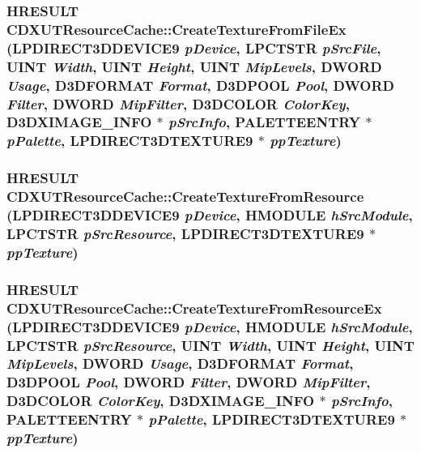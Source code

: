 \hypertarget{class_c_d_x_u_t_resource_cache_a4f33257885010dd13d4e996e9d3d2d3e}{
\subsubsection[{CreateTextureFromFileEx}]{\setlength{\rightskip}{0pt plus 5cm}HRESULT CDXUTResourceCache::CreateTextureFromFileEx (LPDIRECT3DDEVICE9 {\em pDevice}, \/  LPCTSTR {\em pSrcFile}, \/  UINT {\em Width}, \/  UINT {\em Height}, \/  UINT {\em MipLevels}, \/  DWORD {\em Usage}, \/  D3DFORMAT {\em Format}, \/  D3DPOOL {\em Pool}, \/  DWORD {\em Filter}, \/  DWORD {\em MipFilter}, \/  D3DCOLOR {\em ColorKey}, \/  D3DXIMAGE\_\-INFO $\ast$ {\em pSrcInfo}, \/  PALETTEENTRY $\ast$ {\em pPalette}, \/  LPDIRECT3DTEXTURE9 $\ast$ {\em ppTexture})}}
\label{class_c_d_x_u_t_resource_cache_a4f33257885010dd13d4e996e9d3d2d3e}
\hypertarget{class_c_d_x_u_t_resource_cache_ac2289531afd466288f7b35b2aa2a8ab1}{
\subsubsection[{CreateTextureFromResource}]{\setlength{\rightskip}{0pt plus 5cm}HRESULT CDXUTResourceCache::CreateTextureFromResource (LPDIRECT3DDEVICE9 {\em pDevice}, \/  HMODULE {\em hSrcModule}, \/  LPCTSTR {\em pSrcResource}, \/  LPDIRECT3DTEXTURE9 $\ast$ {\em ppTexture})}}
\label{class_c_d_x_u_t_resource_cache_ac2289531afd466288f7b35b2aa2a8ab1}
\hypertarget{class_c_d_x_u_t_resource_cache_a0da1d5be9bcc2332a63b6a9f3dac24c6}{
\subsubsection[{CreateTextureFromResourceEx}]{\setlength{\rightskip}{0pt plus 5cm}HRESULT CDXUTResourceCache::CreateTextureFromResourceEx (LPDIRECT3DDEVICE9 {\em pDevice}, \/  HMODULE {\em hSrcModule}, \/  LPCTSTR {\em pSrcResource}, \/  UINT {\em Width}, \/  UINT {\em Height}, \/  UINT {\em MipLevels}, \/  DWORD {\em Usage}, \/  D3DFORMAT {\em Format}, \/  D3DPOOL {\em Pool}, \/  DWORD {\em Filter}, \/  DWORD {\em MipFilter}, \/  D3DCOLOR {\em ColorKey}, \/  D3DXIMAGE\_\-INFO $\ast$ {\em pSrcInfo}, \/  PALETTEENTRY $\ast$ {\em pPalette}, \/  LPDIRECT3DTEXTURE9 $\ast$ {\em ppTexture})}}
